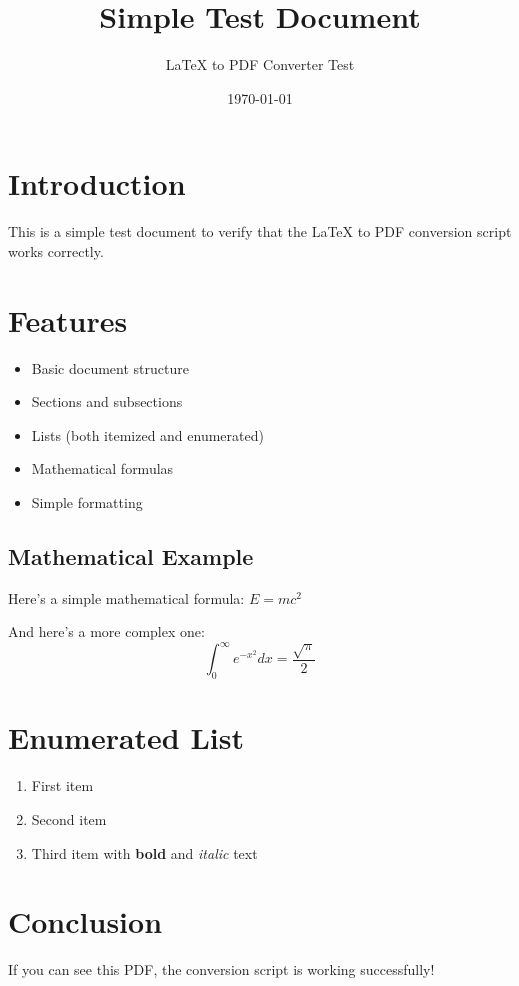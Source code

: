 \documentclass{article}
\title{Simple Test Document}
\author{LaTeX to PDF Converter Test}
\date{\today}
\begin{document}
\maketitle

\section{Introduction}
This is a simple test document to verify that the LaTeX to PDF conversion script works correctly.

\section{Features}
\begin{itemize}
    \item Basic document structure
    \item Sections and subsections
    \item Lists (both itemized and enumerated)
    \item Mathematical formulas
    \item Simple formatting
\end{itemize}

\subsection{Mathematical Example}
Here's a simple mathematical formula: $E = mc^2$

And here's a more complex one:
\[
    \int_{0}^{\infty} e^{-x^2} dx = \frac{\sqrt{\pi}}{2}
\]

\section{Enumerated List}
\begin{enumerate}
    \item First item
    \item Second item
    \item Third item with \textbf{bold} and \textit{italic} text
\end{enumerate}

\section{Conclusion}
If you can see this PDF, the conversion script is working successfully!
\end{document}
